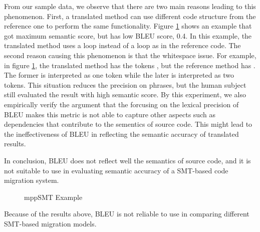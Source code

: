 From our sample data, we observe that there are two main reasons leading 
to this phenomenon.
%
First, a translated method can use different code structure from the 
reference one to perform the same functionality. Figure \ref{fig:mppSMT_example} shows an example
that got maximum semantic score, but has low BLEU score, 0.4. In this example, 
the translated method uses a  loop instead of a  
loop as in the reference code. The second reason causing this phenomenon 
is that the whitespace issue. For example, in figure \ref{fig:mppSMT_example}, the translated method has the 
tokens , but the reference method has . The former 
is interpreted as one token while the later is interpreted as two tokens. 
This situation reduces the precision on phrases, but the human subject still
evaluated the result with high semantic score. By this experiment, we also empirically 
verify the argument that the forcusing on the lexical precision of BLEU makes
this metric is not able to capture other aspects such as dependencies 
that contribute to the sementics of source code. This might lead to the ineffectiveness
of BLEU in reflecting the semantic accuracy of translated results. 

In conclusion, BLEU does not reflect well the
semantics of source code, and it is not suitable to use in evaluating
semantic accuracy of a SMT-based code migration system.

\begin{figure}[t]
\centering

\caption{mppSMT Example}
\label{fig:mppSMT_example}
\end{figure}




Because of the results above, BLEU is not reliable to use in comparing different SMT-based migration models. 

